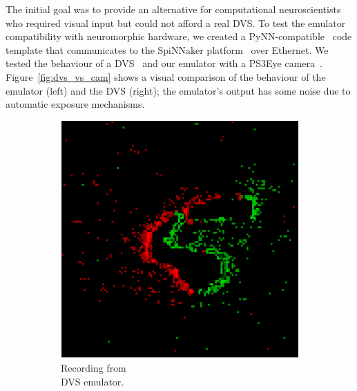 \documentclass[conference]{IEEEtran}
\begin{document}
The initial goal was to provide an alternative for computational neuroscientists who required visual input but could not afford a real DVS. To test the emulator compatibility with neuromorphic hardware, we created a PyNN-compatible~\cite{pynn} code template that communicates to the SpiNNaker platform~\cite{spinnakerOverview} over Ethernet. We tested the behaviour of a DVS~\cite{bernabeDVS} and our emulator with a PS3Eye camera~\cite{wikipedia:ps3eye}. Figure~\ref{fig:dvs_vs_cam} shows a visual comparison of the behaviour of the emulator (left) and the DVS (right); the emulator's output has some noise due to automatic exposure mechanisms. 

\begin{figure}[htb]
\captionsetup[subfigure]{justification=centering}

\centering
\begin{subfigure}[b]{0.24\textwidth}
  \includegraphics[width=\textwidth]{camera_demo}
  \caption{Recording from \\DVS emulator. }
  \label{fig:cam_demo}
\end{subfigure}
\begin{subfigure}[b]{0.24\textwidth}

\end{subfigure}
\end{figure}
\end{document}

